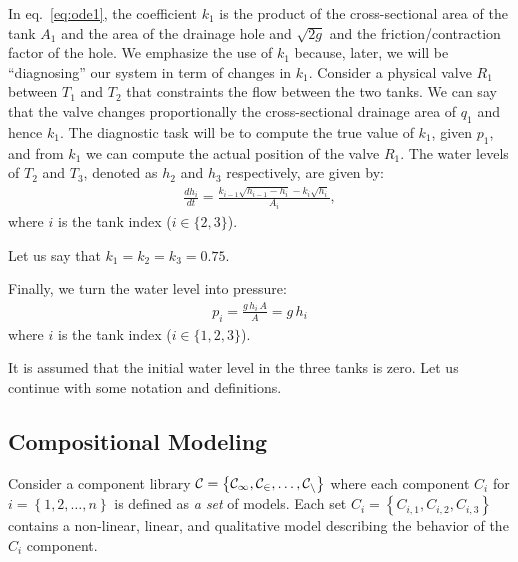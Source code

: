 In eq.~\ref{eq:ode1}, the coefficient $k_1$ is the product of the
cross-sectional area of the tank $A_1$ and the area of the drainage
hole and $\sqrt{2g}$ and the friction/contraction factor of the
hole. We emphasize the use of $k_1$ because, later, we will be
``diagnosing'' our system in term of changes in $k_1$. Consider a
physical valve $R_1$ between $T_1$ and $T_2$ that constraints the flow
between the two tanks. We can say that the valve changes
proportionally the cross-sectional drainage area of $q_1$ and hence
$k_1$. The diagnostic task will be to compute the true value of $k_1$,
given $p_1$, and from $k_1$ we can compute the actual position of the
valve $R_1$.
%
The water levels of $T_2$ and $T_3$, denoted as $h_2$ and $h_3$
respectively, are given by:
%
\begin{eqnarray}\label{eq:tank1}
%
\frac{d h_i}{dt} = \frac{k_{i - 1} \sqrt{h_{i - 1} - h_i} - k_i \sqrt{h_i}}{A_i},
%
\end{eqnarray}
%
where $i$ is the tank index ($i \in \{2, 3\}$).
\par
Let us say that $k_1 = k_2 = k_3 = 0.75$.
\par
Finally, we turn the water level into pressure:
\begin{eqnarray}
p_i = \frac{g\,h_i\,A}{A} = g\,h_i\label{eq:pressure}
\end{eqnarray}
where $i$ is the tank index ($i \in \{1, 2, 3\}$).
\par
It is assumed that the initial water level in the three tanks is zero.
%
Let us continue with some notation and definitions.
%
\subsection{Compositional Modeling}
%
Consider a component library $\cal{C} = \left\{C_1, C_2, \ldots,
C_n\right\}$ where each component $C_i$ for $i = \left\{1, 2, \ldots,
n\right\}$ is defined as \textit{a set} of models. Each set $C_i =
\left\{C_{i, 1}, C_{i, 2}, C_{i, 3}\right\}$ contains a non-linear,
linear, and qualitative model describing the behavior of the $C_i$
component.

